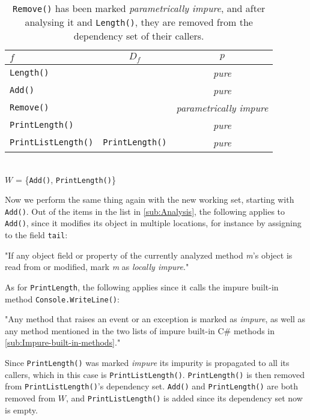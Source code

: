 \documentclass[a4paper,12pt]{article}
\begin{document}
\begin{table}[H]
  \caption{\texttt{Remove()} has been marked \textit{parametrically impure}, and after analysing it and \texttt{Length()}, they are removed from the dependency set of their callers.}
  \label{tab:lookup-table2}
  \centering
  \begin{tabular}{|l|c|c|}
    \hline
    $f$                        & $D_f$                  & $p$                     \\ \hline
    \texttt{Length()}          &                        & \textit{pure}                  \\
    \texttt{Add()}             &                        & \textit{pure}                  \\
    \texttt{Remove()}          &                        & \textit{parametrically impure} \\
    \texttt{PrintLength()}     &                        & \textit{pure}                  \\
    \texttt{PrintListLength()} & \texttt{PrintLength()} & \textit{pure}                  \\ \hline
  \end{tabular}
  \\
  $W$ = \{\texttt{Add()}, \texttt{PrintLength()}\}
\end{table}

Now we perform the same thing again with the new working set, starting with \texttt{Add()}. Out of the items in the list in \autoref{sub:Analysis}, the following applies to \texttt{Add()}, since it modifies its object in multiple locations, for instance by assigning to the field \texttt{tail}:

"If any object field or property of the currently analyzed method \textit{m}'s object is read from or modified, mark \textit{m} as \textit{locally impure}."

As for \texttt{PrintLength}, the following applies since it calls the impure built-in method \texttt{Console.WriteLine()}:

"Any method that raises an event or an exception is marked as \textit{impure}, as well as any method mentioned in the two lists of impure built-in C\# methods in \autoref{sub:Impure-built-in-methods}."

Since \texttt{PrintLength()} was marked \textit{impure} its impurity is propagated to all its callers, which in this case is \texttt{PrintListLength()}. \texttt{PrintLength()} is then removed from \texttt{PrintListLength()}'s dependency set. \texttt{Add()} and \texttt{PrintLength()} are both removed from $W$, and \texttt{PrintListLength()} is added since its dependency set now is empty.
\end{document}
